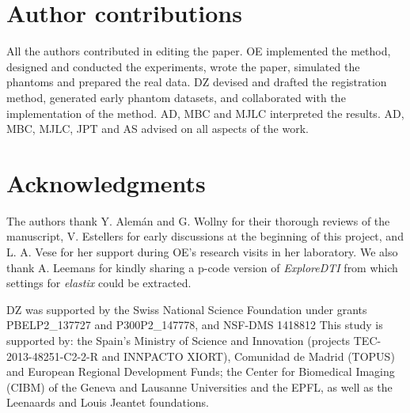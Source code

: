 \section*{Author contributions}
All the authors contributed in editing the paper.
OE implemented the method, designed and conducted the experiments, wrote the paper,
  simulated the phantoms and prepared the real data.
DZ devised and drafted the registration method, generated early phantom datasets, and
  collaborated with the implementation of the method.
AD, MBC and MJLC interpreted the results.
AD, MBC, MJLC, JPT and AS advised on all aspects of the work.

\section*{Acknowledgments}
The authors thank Y. Alem\'an and G. Wollny for their thorough reviews of the manuscript,
  V. Estellers for early discussions at the beginning of this project,
  and L. A. Vese for her support during OE's research visits in her laboratory.
We also thank A. Leemans for kindly sharing a p-code version of \emph{ExploreDTI} from
  which settings for \emph{elastix} could be extracted.

DZ was supported by the Swiss National Science Foundation under grants PBELP2\_137727 
  and P300P2\_147778, and NSF-DMS 1418812
This study is supported by: the Spain's Ministry of Science and Innovation
  (projects TEC-2013-48251-C2-2-R and INNPACTO XIORT), Comunidad de Madrid (TOPUS) and
  European Regional Development Funds; the Center for Biomedical Imaging
  (CIBM) of the Geneva and Lausanne Universities and the EPFL, as well as the
  Leenaards and Louis Jeantet foundations.

